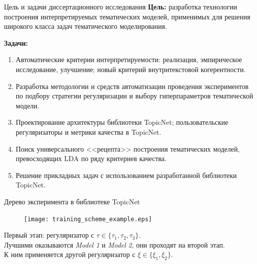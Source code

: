 \begin{frame}[t]{Цель и задачи диссертационного исследования}
\textbf{Цель:} разработка технологии построения интерпретируемых  тематических моделей, применимых для решения широкого класса задач тематического моделирования.

\bigskip
\textbf{Задачи:}
\begin{enumerate}
    \smallskip\item Автоматические критерии интерпретируемости: реализация, эмпирическое исследование, улучшение; новый критерий внутритекстовой когерентности.

    \smallskip\item Разработка методологии и средств автоматизации проведения экспериментов по подбору стратегии регуляризации и выбору гиперпараметров тематической модели.

    \smallskip\item Проектирование архитектуры библиотеки TopicNet; пользовательские регуляризаторы и метрики качества в TopicNet.

    \smallskip\item Поиск универсального <<рецепта>> построения тематических моделей, превосходящих LDA по ряду критериев качества.

    \smallskip\item Решение прикладных задач с использованием разработанной библиотеки TopicNet.

\end{enumerate}
\end{frame}






\begin{frame}{Дерево эксперимента в библиотеке TopicNet}

\begin{figure}[ht]
    \centering
    \texttt{[image: training\_scheme\_example.eps]}
\end{figure} 
        Первый этап: регуляризатор с $\tau \in \{\tau_1, \tau_2, \tau_3\}$.\\
        Лучшими оказываются \emph{Model 1} и \emph{Model 2}, они проходят на второй этап.\\
        К ним применяется другой регуляризатор с $\xi \in \{\xi_1, \xi_2\}$.
\end{frame}

